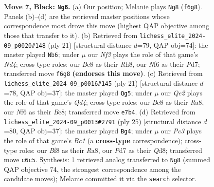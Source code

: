 \documentclass[11pt]{article}
\begin{document}
\begin{figure}[p]
\caption{\textbf{Move 7, Black: \texttt{Ng8}.} (a) Our position; Melanie plays \texttt{Ng8} (\texttt{f6g8}). Panels (b)--(d) are the retrieved master positions whose correspondence most drove this move (highest QAP objective among those that transfer to it). (b) Retrieved from \texttt{lichess\_elite\_2024-09\_p0020\#148} (ply 21) [structural distance $d$=79, QAP obj=74]: the master played \texttt{Nb6}; under $\mu$ our \emph{Nf3} plays the role of that game's \emph{Nd4}; cross-type roles: our \emph{B}c8 as their \emph{R}h8, our \emph{N}f6 as their \emph{P}d7; transferred move \texttt{f6g8} \textbf{(endorses this move)}. (c) Retrieved from \texttt{lichess\_elite\_2024-09\_p0016\#145} (ply 21) [structural distance $d$=78, QAP obj=37]: the master played \texttt{Qg5}; under $\mu$ our \emph{Qe2} plays the role of that game's \emph{Qd4}; cross-type roles: our \emph{B}c8 as their \emph{R}a8, our \emph{N}f6 as their \emph{B}c8; transferred move \texttt{e7b4}. (d) Retrieved from \texttt{lichess\_elite\_2024-09\_p0013\#2791} (ply 25) [structural distance $d$=80, QAP obj=37]: the master played \texttt{Bg4}; under $\mu$ our \emph{Pc3} plays the role of that game's \emph{Bc1} (a \textbf{cross-type} correspondence); cross-type roles: our \emph{B}f8 as their \emph{R}a8, our \emph{P}d7 as their \emph{Q}d8; transferred move \texttt{c6c5}. Synthesis: 1 retrieved analog transferred to \texttt{Ng8} (summed QAP objective 74, the strongest correspondence among the candidate moves); Melanie committed it via the \texttt{search} selector.}
\label{fig:thought-m13}
\end{figure}

\clearpage
\end{document}
